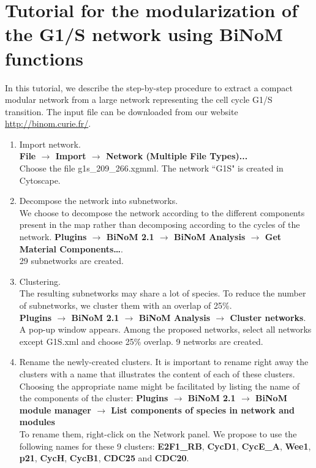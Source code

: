 \documentclass[a4paper,10pt]{article}
\begin{document}
\section*{Tutorial for the modularization of the G1/S network using BiNoM functions}
In this tutorial, we describe the step-by-step procedure to extract a compact
modular network from a large network representing the cell cycle G1/S
transition. The input file can be downloaded from our website
\url{http://binom.curie.fr/}.
\begin{enumerate}
\item Import network. \\
\textbf{File $\rightarrow$ Import $\rightarrow$ Network (Multiple File Types)...}\\
Choose the file g1s\_209\_266.xgmml.
The network ``G1S" is created in Cytoscape.


\item	Decompose the network into subnetworks. \\
We choose to decompose the network according to the different components present
in the map rather than decomposing according to the cycles of the network. 
\textbf{Plugins $\rightarrow$ BiNoM 2.1 $\rightarrow$ BiNoM Analysis $\rightarrow$ Get Material
Components…}.\\
29 subnetworks are created.

\item	Clustering. \\
The resulting subnetworks may share a lot of species. To reduce the number of
subnetworks, we cluster them with an overlap of 25\%. \\
\textbf{Plugins $\rightarrow$  BiNoM 2.1 $\rightarrow$ BiNoM Analysis $\rightarrow$ Cluster networks}. \\
A pop-up window appears. Among the proposed networks, select all networks except
G1S.xml and choose 25\% overlap. 9 networks are created.

\item	Rename the newly-created clusters.
It is important to rename right away the clusters with a name that illustrates
the content of each of these clusters. 
Choosing the appropriate name might be facilitated by listing the name of the
components of the cluster: \textbf{Plugins $\rightarrow$  BiNoM 2.1 $\rightarrow$ BiNoM module manager
$\rightarrow$ List components of species in network and modules} \\
To rename them, right-click on the Network panel.
We propose to use the following names for these 9 clusters: \textbf{E2F1\_RB},
\textbf{CycD1}, \textbf{CycE\_A}, \textbf{Wee1}, \textbf{p21}, \textbf{CycH}, \textbf{CycB1}, \textbf{CDC25} and \textbf{CDC20}.


\end{enumerate}
\end{document}
